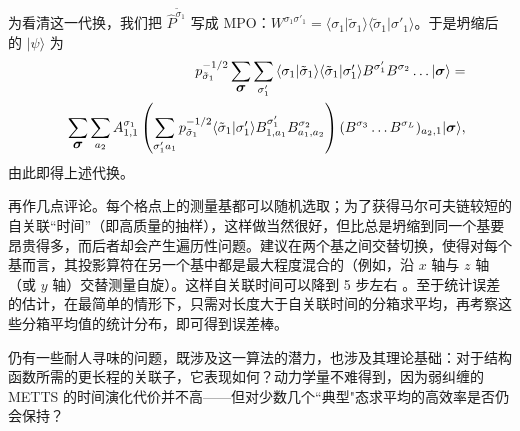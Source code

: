 \documentclass[a4paper,10pt,oneside,onecolumn,1p,times]{elsarticle}
\newcommand{\ket}[1]{\mbox{$| #1  \rangle$}}
\newcommand{\braket}[2]{\mbox{$\langle #1  | #2 \rangle$}} 	%
\newcommand{\fat}[1]{\mbox{\boldmath$#1$\unboldmath}}	%
\begin{document}
为看清这一代换，我们把 $\hat{P}^{\tilde{\sigma}_1}$ 写成 MPO：$W^{\sigma_1 \sigma'_1} = \braket{\sigma_1}{\tilde{\sigma}_1} \braket{\tilde{\sigma}_1}{\sigma'_1}$。于是坍缩后的 $\ket{\psi}$ 为
\begin{eqnarray*}
& & p_{\tilde{\sigma}_1}^{-1/2} \sum_{\fat{\sigma}} \sum_{\sigma'_1} \braket{\sigma_1}{\tilde{\sigma}_1} \braket{\tilde{\sigma}_1}{\sigma'_1} B^{\sigma'_1} B^{\sigma_2} \ldots \ket{\fat{\sigma}} = \\
& & \sum_{\fat{\sigma}} \sum_{a_2} A^{\sigma_1}_{1,1} \left( \sum_{\sigma'_1 a_1}  p_{\tilde{\sigma}_1}^{-1/2}  \braket{\tilde{\sigma}_1}{\sigma'_1} B^{\sigma'_1}_{1,a_1} B^{\sigma_2}_{a_1,a_2} \right) (B^{\sigma_3} \ldots B^{\sigma_L})_{a_2,1} \ket{\fat{\sigma}} ,
\end{eqnarray*}
由此即得上述代换。

再作几点评论。每个格点上的测量基都可以随机选取；为了获得马尔可夫链较短的自关联``时间''（即高质量的抽样），这样做当然很好，但比总是坍缩到同一个基要昂贵得多，而后者却会产生遍历性问题。建议在两个基之间交替切换，使得对每个基而言，其投影算符在另一个基中都是最大程度混合的（例如，沿 $x$ 轴与 $z$ 轴（或 $y$ 轴）交替测量自旋）。这样自关联时间可以降到 5 步左右 \cite{Stoudenmire10}。至于统计误差的估计，在最简单的情形下，只需对长度大于自关联时间的分箱求平均，再考察这些分箱平均值的统计分布，即可得到误差棒。

仍有一些耐人寻味的问题，既涉及这一算法的潜力，也涉及其理论基础：对于结构函数所需的更长程的关联子，它表现如何？动力学量不难得到，因为弱纠缠的 METTS 的时间演化代价并不高——但对少数几个``典型"态求平均的高效率是否仍会保持？
\end{document}
